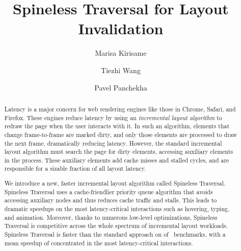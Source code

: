 \documentclass[acmsmall, screen]{acmart}
\begin{document}
\title{Spineless Traversal for Layout Invalidation}

\author{Marisa Kirisame}

\author{Tiezhi Wang}

\author{Pavel Panchekha}

\begin{abstract}
Latency is a major concern for web rendering engines
  like those in Chrome, Safari, and Firefox.
These engines reduce latency by using
  an \emph{incremental layout algorithm}
  to redraw the page when
  the user interacts with it.
In such an algorithm,
  elements that change frame-to-frame are marked dirty, and
  only those elements are processed
  to draw the next frame,
  dramatically reducing latency.
However, the standard incremental layout algorithm
  must search the page for dirty elements,
  accessing auxiliary elements in the process.
These auxiliary elements
  add cache misses and stalled cycles,
  and are responsible for a sizable fraction
  of all layout latency.

We introduce a new, faster incremental layout algorithm
  called Spineless Traversal.
Spineless Traversal
  uses a cache-friendlier priority queue algorithm
  that avoids accessing auxiliary nodes
  and thus reduces cache traffic and stalls.
This leads to dramatic speedups
  on the most latency-critical interactions
  such as hovering, typing, and animation.
Moreover, thanks to numerous low-level optimizations,
  Spineless Traversal is competitive
  across the whole spectrum of incremental layout workloads.
Spineless Traversal is faster than the standard approach
  on \PctFaster of \NumFrames~benchmarks,
  with a mean speedup of \MeanSpeedup
  concentrated in the most latency-critical interactions.
\end{abstract}


\end{document}
